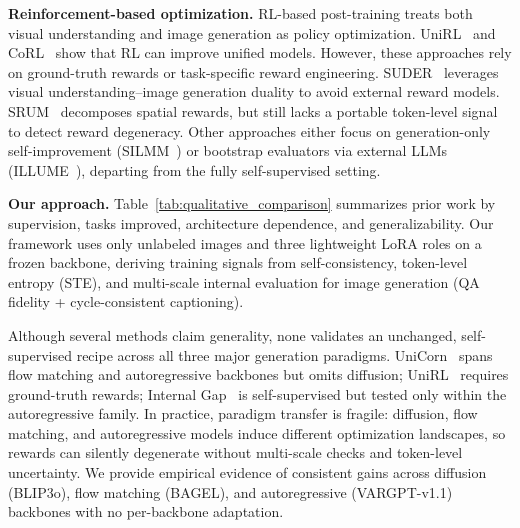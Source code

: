 \noindent\textbf{Reinforcement-based optimization.}
RL-based post-training treats both visual understanding and image generation as policy optimization. UniRL~\citep{mao2025unirl} and CoRL~\citep{jiang2025coreinforcement} show that RL can improve unified models. However, these approaches rely on ground-truth rewards or task-specific reward engineering. SUDER~\citep{hong2025dualselfrewards} leverages visual understanding--image generation duality to avoid external reward models. SRUM~\citep{jin2025srum} decomposes spatial rewards, but still lacks a portable token-level signal to detect reward degeneracy. Other approaches either focus on generation-only self-improvement (SILMM~\citep{qu2024silmm}) or bootstrap evaluators via external LLMs (ILLUME~\citep{wang2024illume}), departing from the fully self-supervised setting.



\noindent\textbf{Our approach.}
Table~\ref{tab:qualitative_comparison} summarizes prior work by supervision, tasks improved, architecture dependence, and generalizability. Our framework uses only unlabeled images and three lightweight LoRA roles on a frozen backbone, deriving training signals from self-consistency, token-level entropy (STE), and multi-scale internal evaluation for image generation (QA fidelity + cycle-consistent captioning).

Although several methods claim generality, none validates an unchanged, self-supervised recipe across all three major generation paradigms. UniCorn~\citep{han2026unicorn} spans flow matching and autoregressive backbones but omits diffusion; UniRL~\citep{mao2025unirl} requires ground-truth rewards; Internal Gap~\citep{han2025internalgap} is self-supervised but tested only within the autoregressive family. In practice, paradigm transfer is fragile: diffusion, flow matching, and autoregressive models induce different optimization landscapes, so rewards can silently degenerate without multi-scale checks and token-level uncertainty. We provide empirical evidence of consistent gains across diffusion (BLIP3o), flow matching (BAGEL), and autoregressive (VARGPT-v1.1) backbones with no per-backbone adaptation.




